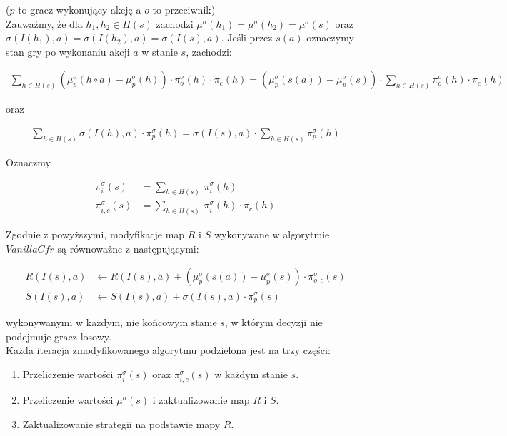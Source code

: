 \documentclass[magisterska]{pracamgr}
\begin{document}
\noindent
($p$ to gracz wykonujący akcję a $o$ to przeciwnik) \\

\noindent
Zauważmy, że dla $h_1, h_2 \in H(s)$ zachodzi $\mu^{\sigma}(h_1) = \mu^{\sigma}(h_2) = \mu^{\sigma}(s)$ oraz
$\sigma(I(h_1), a) = \sigma(I(h_2), a) = \sigma(I(s), a). $
Jeśli przez $s(a)$ oznaczymy stan gry po wykonaniu akcji $a$ w stanie $s$, zachodzi: 

\begin{align*}
\sum\limits_{h \in H(s)} (\mu_p^{\sigma}(h \circ a) - \mu_p^{\sigma}(h)) \cdot \pi_o^{\sigma}(h) \cdot \pi_c(h) =
(\mu_p^{\sigma}(s(a)) - \mu_p^{\sigma}(s)) \cdot \sum\limits_{h \in H(s)} \pi_o^{\sigma}(h) \cdot \pi_c(h)
\end{align*}

\noindent
oraz

\begin{align*}
\sum\limits_{h \in H(s)} \sigma(I(h), a) \cdot \pi_p^{\sigma}(h) =
\sigma(I(s), a) \cdot \sum\limits_{h \in H(s)} \pi_p^{\sigma}(h)
\end{align*}

\noindent
Oznaczmy

\begin{align*}
\pi_i^{\sigma}(s) &= \sum\limits_{h \in H(s)} \, \pi_i^{\sigma}(h) \\
\pi_{i,c}^{\sigma}(s) &= \sum\limits_{h \in H(s)} \, \pi_i^{\sigma}(h) \cdot \pi_c(h)
\end{align*}

\noindent
Zgodnie z powyższymi, modyfikacje map $R$ i $S$ wykonywane w algorytmie $VanillaCfr$ są
równoważne z następującymi:

\begin{align*}
R(I(s), a) &\leftarrow R(I(s), a) + (\mu_p^{\sigma}(s(a)) - \mu_p^{\sigma}(s)) \cdot \pi_{o,c}^{\sigma}(s) \\
S(I(s), a) &\leftarrow S(I(s), a) + \sigma(I(s), a) \cdot \pi_p^{\sigma}(s)
\end{align*}

\noindent
wykonywanymi w każdym, nie końcowym stanie $s$, w którym decyzji nie podejmuje gracz losowy. \\

\noindent
Każda iteracja zmodyfikowanego algorytmu podzielona jest na trzy części:
\begin{enumerate}
\item Przeliczenie wartości $\pi_i^{\sigma}(s)$ oraz $\pi_{i, c}^{\sigma}(s)$ w każdym stanie $s$.
\item Przeliczenie wartości $\mu^{\sigma}(s)$ i zaktualizowanie map $R$ i $S$.
\item Zaktualizowanie strategii na podstawie mapy $R$.
\end{enumerate}
\end{document}
